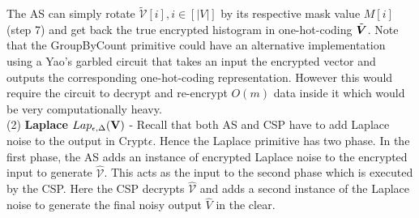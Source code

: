 The \textsf{AS} can simply rotate $\boldsymbol{\tilde{\mathcal{V}}}[i], i \in [|V|]$ by its respective mask value $M[i]$ (step 7) and get back the true encrypted histogram in one-hot-coding $\tilde{\boldsymbol{V}}$.
Note that the \textsf{GroupByCount} primitive could have an alternative implementation using a Yao's garbled circuit that takes an input the encrypted vector and outputs the corresponding one-hot-coding representation. However this would require the circuit to decrypt and re-encrypt $O(m)$ data inside it which would be very computationally heavy. 
 \\ (2)\textbf{ \textsf{Laplace }}$Lap_{\epsilon,\Delta}(\mathbf{V})$ -  
Recall that both \textsf{AS} and \textsf{CSP} have to add Laplace noise to the output in Crypt$\epsilon$. Hence the \textsf{Laplace} primitive has two phase. In the first phase,  the \textsf{AS} adds an instance of encrypted Laplace noise to the encrypted input  to generate $\mathbf{\hat{\mathcal{V}}}$. This acts as the input to the second phase which is executed by the \textsf{CSP}. Here the \textsf{CSP} decrypts $\mathbf{\hat{\mathcal{V}}}$ and adds a second instance of the Laplace noise to generate the final noisy output $\hat{V}$ in the clear. %
